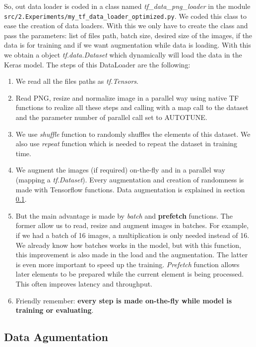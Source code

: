So, out data loader is coded in a class named \textit{tf\_data\_png\_loader} in the module \texttt{src\-/2.Experiments\-/my\_tf\_data\-\_loader\-\_optimized\-.py}. We coded this class to ease the creation of data loaders. With this we only have to create the class and pass the parameters: list of files path, batch size, desired size of the images, if the data is for training and if we want augmentation while data is loading. With this we obtain a object \textit{tf.data.Dataset} which dynamically will load the data in the Keras model. The steps of this DataLoader are the following:
\begin{enumerate}
    \item We read all the files paths as \textit{tf.Tensors}.
    \item Read PNG, resize and normalize image in a parallel way using native TF functions to realize all these steps and calling with a map call to the dataset and the parameter number of parallel call set to AUTOTUNE.
    \item We use \textit{shuffle} function to randomly shuffles the elements of this dataset. We also use \textit{repeat} function which is needed to repeat the dataset in training time.
    \item We augment the images (if required) on-the-fly and in a parallel way (mapping a \textit{tf.Dataset}). Every augmentation and creation of randomness is made with Tensorflow functions. Data augmentation is explained in section \ref{subsection:dataaug}.
    \item But the main advantage is made by \textit{batch} and \textbf{prefetch} functions. The former allow us to read, resize and augment images in batches. For example, if we had a batch of 16 images, a multiplication is only needed instead of 16. We already know how batches works in the model, but with this function, this improvement is also made in the load and the augmentation. The latter is even more important to speed up the training. \textit{Prefetch} function allows later elements to be prepared while the current element is being processed. This often improves latency and throughput.
    \item Friendly remember: \textbf{every step is made on-the-fly while model is training or evaluating}.
\end{enumerate}

\subsection{Data Agumentation}
\label{subsection:dataaug}

